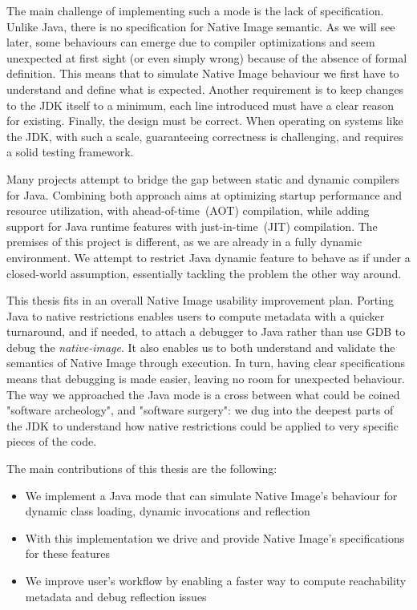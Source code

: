 The main challenge of implementing such a mode is the lack of specification. Unlike Java, there is no specification for Native Image semantic. As we will see later, some behaviours can emerge due to compiler optimizations and seem unexpected at first sight (or even simply wrong) because of the absence of formal definition.
This means that to simulate Native Image behaviour we first have to understand and define what is expected.
Another requirement is to keep changes to the JDK itself to a minimum, each line introduced must have a clear reason for existing.
Finally, the design must be correct. When operating on systems like the JDK, with such a scale, guaranteeing correctness is challenging, and requires a solid testing framework.

Many projects attempt to bridge the gap between static and dynamic compilers for Java. Combining both approach aims at optimizing startup performance and resource utilization, with ahead-of-time~(AOT) compilation, while adding support for Java runtime features with just-in-time~(JIT) compilation.
The premises of this project is different, as we are already in a fully dynamic environment. We attempt to restrict Java dynamic feature to behave as if under a closed-world assumption, essentially tackling the problem the other way around.

This thesis fits in an overall Native Image usability improvement plan.
Porting Java to native restrictions enables users to compute metadata with a quicker turnaround, and if needed, to attach a debugger to Java rather than use GDB to debug the \textit{native-image}. It also enables us to both understand and validate the semantics of Native Image through execution. In turn, having clear specifications means that debugging is made easier, leaving no room for unexpected behaviour.
The way we approached the Java mode is a cross between what could be coined "software archeology", and 
"software surgery": we dug into the deepest parts of the JDK to understand how native restrictions could be applied to very specific pieces of the code.

The main contributions of this thesis are the following:
\begin{itemize}
  \item We implement a Java mode that can simulate Native Image's behaviour for dynamic class loading, dynamic invocations and reflection
  \item With this implementation we drive and provide Native Image's specifications for these features
  \item We improve user's workflow by enabling a faster way to compute reachability metadata and debug reflection issues
\end{itemize}

